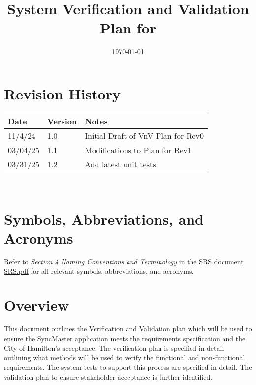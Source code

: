 \documentclass[12pt, titlepage]{article}
\begin{document}
\title{System Verification and Validation Plan for \progname{}}
\author{\authname}
\date{\today}

\maketitle


\section*{Revision History}

\begin{tabularx}{\textwidth}{p{3cm}p{2cm}X}
  \toprule {\bf Date} & {\bf Version} & {\bf Notes}\\
  \midrule
  11/4/24 & 1.0 & Initial Draft of VnV Plan for Rev0\\
  03/04/25 & 1.1 & Modifications to Plan for Rev1\\
  03/31/25 & 1.2 & Add latest unit tests\\
  \bottomrule
\end{tabularx}

~\\

\newpage

\tableofcontents

\listoftables

\section*{Symbols, Abbreviations, and Acronyms}

Refer to \textit{Section 4 Naming Conventions and Terminology} in the
SRS document
\href{https://github.com/Spitgranger/SyncMaster/blob/main/docs/SRS-Volere/SRS.pdf}{SRS.pdf}
for all relevant symbols, abbreviations, and acronyms.

\newpage


\section{Overview}

This document outlines the Verification and Validation plan which will be used
to ensure the SyncMaster application meets the requirements specification
and the City of Hamilton's acceptance. The verification plan is specified
in detail outlining what methods will be used to verify the
functional and non-functional
requirements. The system tests to support this process are specified in detail.
The validation plan to ensure stakeholder acceptance is further identified.
\end{document}

